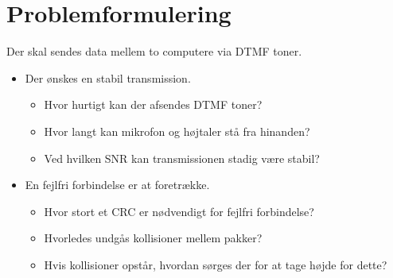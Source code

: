\newpage
\section{Problemformulering}
Der skal sendes data mellem to computere via DTMF toner.
\begin{itemize}[noitemsep]
	\item	Der ønskes en stabil transmission.
	\begin{itemize}[noitemsep]
	\item	Hvor hurtigt kan der afsendes DTMF toner?
	\item	Hvor langt kan mikrofon og højtaler stå fra hinanden?
	\item	Ved hvilken SNR kan transmissionen stadig være stabil?
	\end{itemize}
	\item	En fejlfri forbindelse er at foretrække.
	\begin{itemize}[noitemsep]
	\item	Hvor stort et CRC er nødvendigt for fejlfri forbindelse?
	\item	Hvorledes undgås kollisioner mellem pakker?
	\item	Hvis kollisioner opstår, hvordan sørges der for at tage højde for dette?
	\end{itemize}
\end{itemize}





